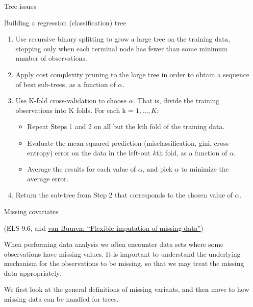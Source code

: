 \documentclass[
  ignorenonframetext,
]{beamer}
\providecommand{\tightlist}{%
  \setlength{\itemsep}{0pt}\setlength{\parskip}{0pt}}
\begin{document}
\begin{frame}{Tree issues}
\protect\hypertarget{tree-issues}{}

\begin{block}{Building a regression (classification) tree}

\begin{enumerate}
\tightlist
\item
  Use recursive binary splitting to grow a large tree on the training
  data, stopping only when each terminal node has fewer than some
  minimum number of observations.
\item
  Apply cost complexity pruning to the large tree in order to obtain a
  sequence of best sub-trees, as a function of \(\alpha\).
\item
  Use K-fold cross-validation to choose \(\alpha\). That is, divide the
  training observations into K folds. For each k = \(1,\ldots, K\):

  \begin{itemize}
  \tightlist
  \item
    Repeat Steps 1 and 2 on all but the kth fold of the training data.
  \item
    Evaluate the mean squared prediction (misclassification, gini,
    cross-entropy) error on the data in the left-out \(k\)th fold, as a
    function of \(\alpha\).
  \item
    Average the results for each value of \(\alpha\), and pick
    \(\alpha\) to minimize the average error.
  \end{itemize}
\item
  Return the sub-tree from Step 2 that corresponds to the chosen value
  of \(\alpha\).
\end{enumerate}

\end{block}

\end{frame}

\begin{frame}

\begin{block}{Missing covariates}

(ELS 9.6, and \href{https://stefvanbuuren.name/fimd/}{van Buuren:
``Flexible imputation of missing data''})

When performing data analysis we often encounter data sets where some
observations have missing values. It is important to understand the
underlying mechanism for the observations to be missing, so that we may
treat the missing data appropriately.

We first look at the general definitions of missing variants, and then
move to how missing data can be handled for trees.

\end{block}

\end{frame}
\end{document}

